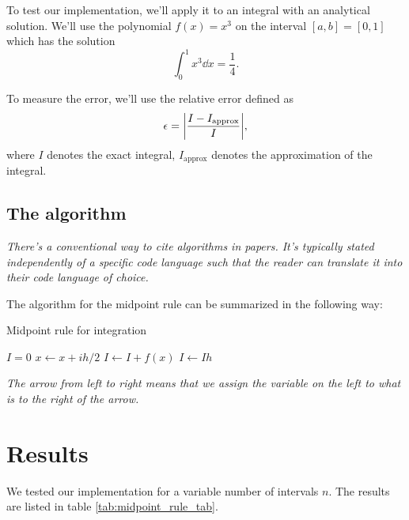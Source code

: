 \documentclass[english,notitlepage, reprint]{revtex4-1}  %
\begin{document}
To test our implementation, we'll apply it to an integral with an analytical solution. We'll use the  polynomial $f(x) = x^3$ on the interval $[a,b] = [0,1]$ which has the solution
\begin{equation}
	\int_0^1 x^3 \dd x = \frac{1}{4}.
\end{equation}

To measure the error, we'll use the relative error defined as
\begin{equation}
 	\epsilon = \abs{ \frac{I - I_{\text{approx}}}{I} },
\end{equation}
where $I$ denotes the exact integral, $I_\text{approx}$ denotes the approximation of the integral.

\subsection*{The algorithm}
\textit{There's a conventional way to cite algorithms in papers. It's typically stated independently of a specific code language such that the reader can translate it into their code language of choice.}

The algorithm for the midpoint rule can be summarized in the following way:

\begin{algorithm}\caption{Midpoint rule for integration}\label{algo:midpoint_rule}
	\begin{algorithmic}
		\State $I = 0$ 
		\State $x \leftarrow x + ih/2$   %
		\State $I \leftarrow I + f(x)$  %
		\EndFor
		\State $I \leftarrow Ih$ 
		\EndProcedure
	\end{algorithmic}
\end{algorithm}


\textit{The arrow from left to right means that we assign the variable on the left to what is to the right of the arrow.}

\section{Results}\label{sec:results}
We tested our implementation for a variable number of intervals $n$. The results are listed in table \ref{tab:midpoint_rule_tab}.
\end{document}
